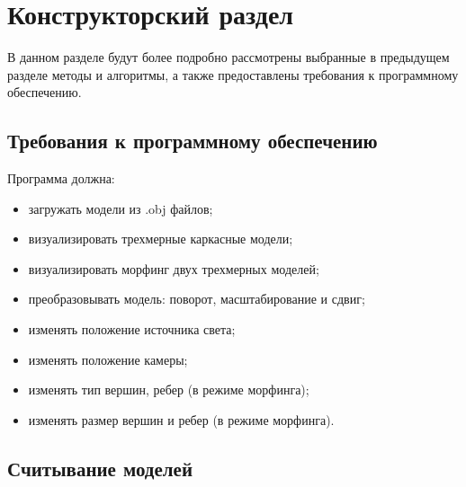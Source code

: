 \chapter{Конструкторский раздел}

В данном разделе будут более подробно рассмотрены выбранные в предыдущем разделе методы и алгоритмы, а также предоставлены требования к программному обеспечению.

\section{Требования к программному обеспечению}

Программа должна:
\begin{itemize}
	\item загружать модели из .obj файлов;
	\item визуализировать трехмерные каркасные модели;
	\item визуализировать морфинг двух трехмерных моделей;
	\item преобразовывать модель: поворот, масштабирование и сдвиг;
	\item изменять положение источника света;
	\item изменять положение камеры;
	\item изменять тип вершин, ребер (в режиме морфинга);
	\item изменять размер вершин и ребер (в режиме морфинга).
\end{itemize}


\section{Считывание моделей}

